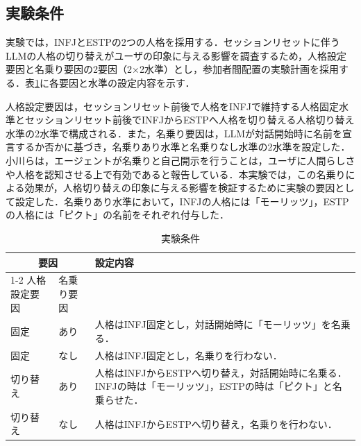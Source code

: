 \documentclass[10pt,twocolumn]{jsarticle}
\begin{document}
\subsection{実験条件}
実験では，INFJとESTPの2つの人格を採用する．セッションリセットに伴うLLMの人格の切り替えがユーザの印象に与える影響を調査するため，人格設定要因と名乗り要因の2要因（2×2水準）とし，参加者間配置の実験計画を採用する．表\ref{tab:experimental_conditions}に各要因と水準の設定内容を示す．

人格設定要因は，セッションリセット前後で人格をINFJで維持する人格固定水準とセッションリセット前後でINFJからESTPへ人格を切り替える人格切り替え水準の2水準で構成される．また，名乗り要因は，LLMが対話開始時に名前を宣言するか否かに基づき，名乗りあり水準と名乗りなし水準の2水準を設定した．小川ら\cite{Ogawa2013}は，エージェントが名乗りと自己開示を行うことは，ユーザに人間らしさや人格を認知させる上で有効であると報告している．本実験では，この名乗りによる効果が，人格切り替えの印象に与える影響を検証するために実験の要因として設定した．名乗りあり水準において，INFJの人格には「モーリッツ」，ESTPの人格には「ピクト」の名前をそれぞれ付与した．

\begin{table}[htbp]
    \centering
    \caption{実験条件}
    \label{tab:experimental_conditions}
    \renewcommand{\arraystretch}{1.2}
    \small
    
    \begin{tabularx}{\linewidth}{llX}
        \hline
        \multicolumn{2}{c}{要因} & \multirow{2}{*}{設定内容} \\
        \cline{1-2}
        人格設定要因 & 名乗り要因 & \\
        \hline
        
        固定 & あり & 人格はINFJ固定とし，対話開始時に「モーリッツ」を名乗る． \\
        
        固定 & なし & 人格はINFJ固定とし，名乗りを行わない． \\
        
        切り替え & あり & 人格はINFJからESTPへ切り替え，対話開始時に名乗る．INFJの時は「モーリッツ」，ESTPの時は「ピクト」と名乗らせた．\\
        
        切り替え & なし & 人格はINFJからESTPへ切り替え，名乗りを行わない． \\
        
        \hline
    \end{tabularx}
\end{table}
\end{document}
